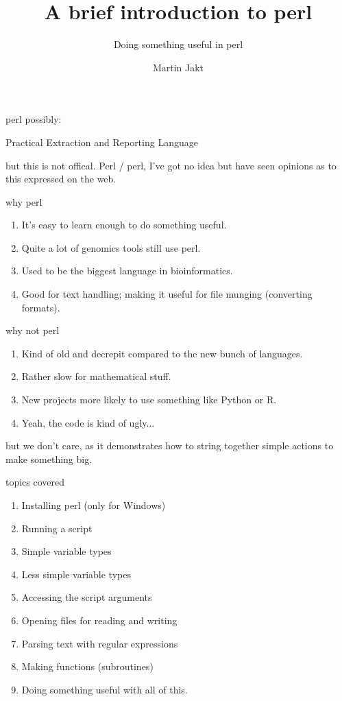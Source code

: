 \documentclass[pdf]{beamer}
\title{A brief introduction to perl}
\subtitle{Doing something useful in perl}
\author{Martin Jakt}
\begin{document}
\begin{frame}
  \titlepage
\end{frame}

\begin{frame}[fragile]{perl}
  possibly:

  Practical Extraction and Reporting Language

  but this is not offical. Perl / perl, I've got no idea but have seen
  opinions as to this expressed on the web.
\end{frame}

\begin{frame}[fragile]{why perl}
  \begin{enumerate}
  \item It's easy to learn enough to do something useful.
  \item Quite a lot of genomics tools still use perl.
  \item Used to be the biggest language in bioinformatics.
  \item Good for text handling; making it useful for file munging (converting
    formats).
  \end{enumerate}
\end{frame}

\begin{frame}[fragile]{why not perl}
  \begin{enumerate}
  \item Kind of old and decrepit compared to the new bunch of languages.
  \item Rather slow for mathematical stuff.
  \item New projects more likely to use something like Python or R.
  \item Yeah, the code is kind of ugly...
  \end{enumerate}

  but we don't care, as it demonstrates how to string together simple
  actions to make something big.
\end{frame}


\begin{frame}[fragile]{topics covered}
  \begin{enumerate}
  \item Installing perl (only for Windows)
  \item Running a script
  \item Simple variable types
  \item Less simple variable types
  \item Accessing the script arguments
  \item Opening files for reading and writing
  \item Parsing text with regular expressions
  \item Making functions (subroutines)
  \item Doing something useful with all of this.
  \end{enumerate}
\end{frame}
\end{document}
